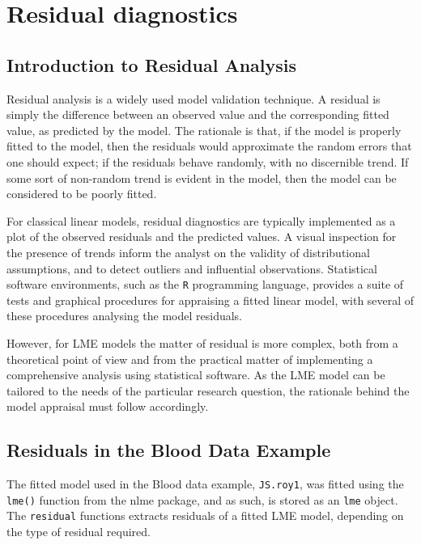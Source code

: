 \documentclass[Main.tex]{subfiles}
\begin{document}
\section{Residual diagnostics} %
\subsection{Introduction to Residual Analysis}
Residual analysis is a widely used model validation technique. A residual is simply the difference between an observed value and the corresponding fitted value, as predicted by the model. The rationale is that, if the model is properly fitted to the model, then the residuals would approximate the random errors that one should expect; if the residuals behave randomly, with no discernible trend. If some sort of non-random trend is evident in the model, then the model can be considered to be poorly fitted.

For classical linear models, residual diagnostics are typically implemented as a plot of the observed residuals and the predicted values. A visual inspection for the presence of trends inform the analyst on the validity of distributional assumptions, and to detect outliers and influential observations. Statistical software environments, such as the \texttt{R} programming language, provides a suite of tests and graphical procedures for appraising a fitted linear model, with several 
of these procedures analysing the model residuals.

However, for LME models the matter of residual is more complex, both from a theoretical point of view and from the practical matter of implementing a comprehensive analysis using statistical software. As the LME model can be tailored to the needs of the particular research question, the rationale behind the model appraisal must follow accordingly.


\subsection{Residuals in the Blood Data Example}
The fitted model used in the Blood data example, \texttt{JS.roy1}, was fitted using the \texttt{lme()} function from the nlme package, and as such, is stored as an \texttt{lme} object. The \texttt{residual} functions extracts residuals of a fitted LME model, depending on the type of residual required.
\end{document}
